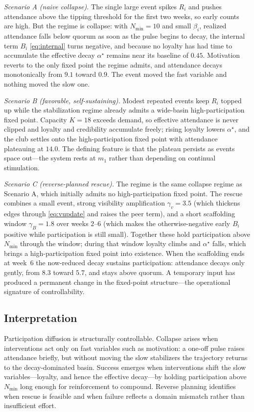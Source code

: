 \documentclass[11pt]{article}
\begin{document}
\emph{Scenario A (naive collapse).} The single large event spikes $R_i$ and pushes attendance above the tipping threshold for the first two weeks, so early counts are high. But the regime is collapse: with $N_{\min}=10$ and small $\beta_i$, realized attendance falls below quorum as soon as the pulse begins to decay, the internal term $B_i$ \eqref{eq:internal} turns negative, and because no loyalty has had time to accumulate the effective decay $\alpha^\star$ remains near its baseline of $0.45$. Motivation reverts to the only fixed point the regime admits, and attendance decays monotonically from $9.1$ toward $0.9$. The event moved the fast variable and nothing moved the slow one.

\emph{Scenario B (favorable, self-sustaining).} Modest repeated events keep $R_i$ topped up while the stabilization regime already admits a wide-basin high-participation fixed point. Capacity $K=18$ exceeds demand, so effective attendance is never clipped and loyalty and credibility accumulate freely; rising loyalty lowers $\alpha^\star$, and the club settles onto the high-participation fixed point with attendance plateauing at $14.0$. The defining feature is that the plateau persists as events space out---the system rests at $m_1$ rather than depending on continual stimulation.

\emph{Scenario C (reverse-planned rescue).} The regime is the same collapse regime as Scenario A, which initially admits no high-participation fixed point. The rescue combines a small event, strong visibility amplification $\gamma_v=3.5$ (which thickens edges through \eqref{eq:vupdate} and raises the peer term), and a short scaffolding window $\gamma_B=1.8$ over weeks $2$--$6$ (which makes the otherwise-negative early $B_i$ positive while participation is still small). Together these hold participation above $N_{\min}$ through the window; during that window loyalty climbs and $\alpha^\star$ falls, which brings a high-participation fixed point into existence. When the scaffolding ends at week~$6$ the now-reduced decay sustains participation: attendance decays only gently, from $8.3$ toward $5.7$, and stays above quorum. A temporary input has produced a permanent change in the fixed-point structure---the operational signature of controllability.

\subsection{Interpretation}
Participation diffusion is structurally controllable. Collapse arises when interventions act only on fast variables such as motivation: a one-off pulse raises attendance briefly, but without moving the slow stabilizers the trajectory returns to the decay-dominated basin. Success emerges when interventions shift the slow variables---loyalty, and hence the effective decay---by holding participation above $N_{\min}$ long enough for reinforcement to compound. Reverse planning identifies when rescue is feasible and when failure reflects a domain mismatch rather than insufficient effort.
\end{document}
